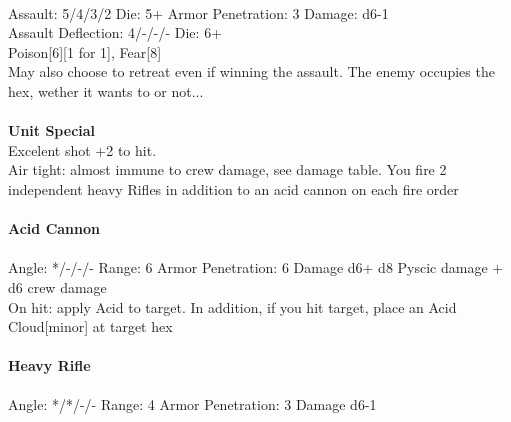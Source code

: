 \ \\
Assault: 5/4/3/2 Die: 5+ Armor Penetration: 3 Damage: d6-1 \\
Assault Deflection: 4/-/-/- Die: 6+\\
\indent Poison[6][1 for 1], Fear[8] \\ May also choose to retreat even if winning the assault. The enemy occupies the hex, wether it wants to or not... \\
\ \\

{\bf Unit Special} \\
Excelent shot +2 to hit. \\ Air tight: almost immune to crew damage, see damage table. You fire 2 independent heavy Rifles in addition to an acid cannon on each fire order
\ \\
\ \\
{\bf Acid Cannon } \\
\ \\
Angle: */-/-/- Range: 6 Armor Penetration: 6 Damage d6+ d8 Pyscic damage + d6 crew damage \\
\indent On hit: apply Acid to target. In addition, if you hit target, place an Acid Cloud[minor] at target hex \\



\ \\
{\bf Heavy Rifle } \\
\ \\
Angle: */*/-/- Range: 4 Armor Penetration: 3 Damage d6-1 \\
\indent  \\





